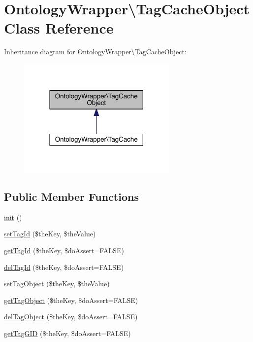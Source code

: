 \hypertarget{class_ontology_wrapper_1_1_tag_cache_object}{\section{Ontology\-Wrapper\textbackslash{}Tag\-Cache\-Object Class Reference}
\label{class_ontology_wrapper_1_1_tag_cache_object}
}


Inheritance diagram for Ontology\-Wrapper\textbackslash{}Tag\-Cache\-Object\-:\nopagebreak
\begin{figure}[H]
\begin{center}
\leavevmode
\includegraphics[width=222pt]{class_ontology_wrapper_1_1_tag_cache_object__inherit__graph}
\end{center}
\end{figure}
\subsection*{Public Member Functions}
\begin{DoxyCompactItemize}
\item 
\hyperlink{class_ontology_wrapper_1_1_tag_cache_object_a560d3ea289197fbcc0268590bd4c937c}{init} ()
\item 
\hyperlink{class_ontology_wrapper_1_1_tag_cache_object_a5623fe3e494a29d7518abc5ffe76e688}{set\-Tag\-Id} (\$the\-Key, \$the\-Value)
\item 
\hyperlink{class_ontology_wrapper_1_1_tag_cache_object_a136e04c97cbefe02abd6f237f2118287}{get\-Tag\-Id} (\$the\-Key, \$do\-Assert=F\-A\-L\-S\-E)
\item 
\hyperlink{class_ontology_wrapper_1_1_tag_cache_object_a3374f814f4a1d96470932d105761eead}{del\-Tag\-Id} (\$the\-Key, \$do\-Assert=F\-A\-L\-S\-E)
\item 
\hyperlink{class_ontology_wrapper_1_1_tag_cache_object_a219ea904f544bde247bd498108dec7e0}{set\-Tag\-Object} (\$the\-Key, \$the\-Value)
\item 
\hyperlink{class_ontology_wrapper_1_1_tag_cache_object_af9f3670137201be86107461026b70a10}{get\-Tag\-Object} (\$the\-Key, \$do\-Assert=F\-A\-L\-S\-E)
\item 
\hyperlink{class_ontology_wrapper_1_1_tag_cache_object_adc4d98f5c9b1ac96e04bd58107d5b557}{del\-Tag\-Object} (\$the\-Key, \$do\-Assert=F\-A\-L\-S\-E)
\item 
\hyperlink{class_ontology_wrapper_1_1_tag_cache_object_ac0cb491eae6addb59a132b8fb11f8c31}{get\-Tag\-G\-I\-D} (\$the\-Key, \$do\-Assert=F\-A\-L\-S\-E)
\end{DoxyCompactItemize}


